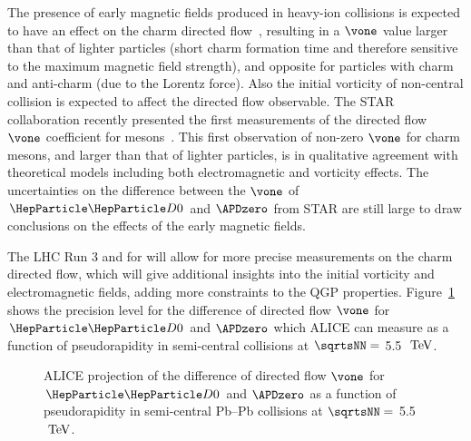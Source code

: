 The presence of early magnetic fields produced in heavy-ion collisions is expected to have an effect on the charm directed flow~\cite{Das:2016cwd,Chatterjee:2018lsx,Plumari,Sandeep}, resulting in a $\vone$ value larger than that of lighter particles (short charm formation time and therefore sensitive to the maximum magnetic field strength), and opposite for particles with charm and anti-charm (due to the Lorentz force). Also the initial vorticity of non-central collision is expected to affect the directed flow observable.
The STAR collaboration recently presented the first measurements of the directed flow $\vone$ coefficient for mesons~\cite{Singha}. This first observation of non-zero $\vone$ for charm mesons, and larger than that of lighter particles, is in qualitative agreement with theoretical models including both electromagnetic and vorticity effects. The uncertainties on the difference between the $\vone$ of $\PDz$ and $\APDzero$
from STAR are still large to draw conclusions on the effects of the early magnetic fields.

The LHC Run 3 and for will allow for more precise measurements on the charm directed flow, which will give additional insights into the initial vorticity and electromagnetic fields, adding more constraints to the QGP properties. Figure~\ref{fig:v1} shows the precision level for the difference of directed flow $\vone$ for $\PDz$ and $\APDzero$ which ALICE can measure as a function of pseudorapidity in semi-central \PbPb collisions at $\sqrtsNN=$ 5.5 $~\text{TeV}$.

\begin{figure}
\centering
{}
\caption{ALICE projection of the difference of directed flow $\vone$ for $\PDz$ and $\APDzero$ as a function of pseudorapidity in semi-central Pb--Pb collisions at $\sqrtsNN=$ 5.5 $~\text{TeV}$.}
\label{fig:v1}
\end {figure}


